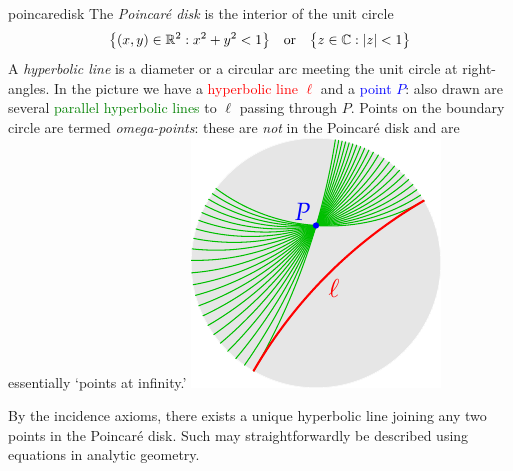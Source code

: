 \begin{defn}[lower separated=false, sidebyside, sidebyside align=top seam, sidebyside gap=0pt, righthand width=0.3\linewidth]{}{poincaredisk}
	The \emph{Poincaré disk} is the interior of the unit circle
	\[
		\bigl\{(x,y)\in\mathbb{R}^2:x^2+y^2<1\bigr\}
		\quad\text{or}\quad
		\bigl\{z\in\mathbb{C}:\left| z\right|<1\bigr\}
	\]
	A \emph{hyperbolic line} is a diameter or a circular arc meeting the unit circle at right-angles.\smallbreak
	In the picture we have a \textcolor{red}{hyperbolic line $\ell$} and a \textcolor{blue}{point $P$}: also drawn are several \textcolor{Green}{parallel hyperbolic lines} to $\ell$ passing through $P$.\smallbreak
	Points on the boundary circle are termed \emph{omega-points}: these are \emph{not} in the Poincaré disk and are essentially `points at infinity.' 
	\tcblower
	\flushright\includegraphics{models-parallels}
\end{defn}

By the incidence axioms, there exists a unique hyperbolic line joining any two points in the Poincaré disk. Such may straightforwardly be described using equations in analytic geometry.

